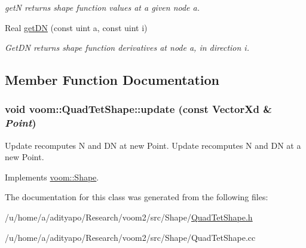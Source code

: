 \begin{DoxyCompactItemize}
\begin{DoxyCompactList}\small\item\em getN returns shape function values at a given node a. \item\end{DoxyCompactList}\item 
\hypertarget{classvoom_1_1_quad_tet_shape_a61a6d7d67989036ca050059077792928}{
Real \hyperlink{classvoom_1_1_quad_tet_shape_a61a6d7d67989036ca050059077792928}{getDN} (const uint a, const uint i)}
\label{classvoom_1_1_quad_tet_shape_a61a6d7d67989036ca050059077792928}

\begin{DoxyCompactList}\small\item\em GetDN returns shape function derivatives at node a, in direction i. \item\end{DoxyCompactList}\end{DoxyCompactItemize}


\subsection{Member Function Documentation}
\hypertarget{classvoom_1_1_quad_tet_shape_a299d2a86a8444228197fa93fae54d45e}{
\subsubsection[{update}]{\setlength{\rightskip}{0pt plus 5cm}void voom::QuadTetShape::update (const VectorXd \& {\em Point})}}
\label{classvoom_1_1_quad_tet_shape_a299d2a86a8444228197fa93fae54d45e}


Update recomputes N and DN at new Point. Update recomputes N and DN at a new Point. 

Implements \hyperlink{classvoom_1_1_shape_a8ded544de12647543b056cec61be9f26}{voom::Shape}.

The documentation for this class was generated from the following files:\begin{DoxyCompactItemize}
\item 
/u/home/a/adityapo/Research/voom2/src/Shape/\hyperlink{_quad_tet_shape_8h}{QuadTetShape.h}\item 
/u/home/a/adityapo/Research/voom2/src/Shape/QuadTetShape.cc\end{DoxyCompactItemize}
